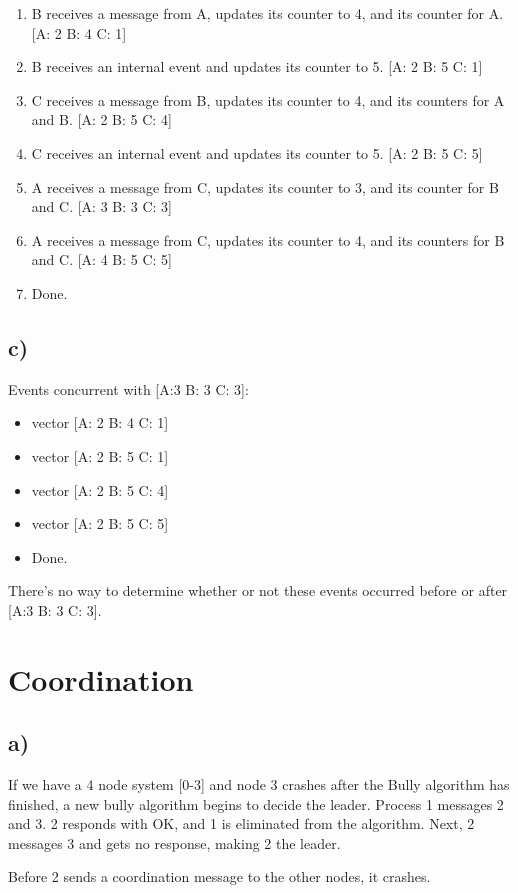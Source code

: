 \documentclass[12pt]{article}
\begin{document}
\begin{enumerate}
\item B receives a message from A, updates its counter to 4, and its counter for A.
[A: 2 B: 4 C: 1]
\item B receives an internal event and updates its counter to 5. [A: 2 B: 5 C: 1]
\item C receives a message from B, updates its counter to 4, and its counters for A and B. [A: 2 B: 5 C: 4]
\item C receives an internal event and updates its counter to 5. [A: 2 B: 5 C: 5]
\item A receives a message from C, updates its counter to 3, and its counter for B and C. [A: 3 B: 3 C: 3]
\item A receives a message from C, updates its counter to 4, and its counters for B and C. [A: 4 B: 5 C: 5]
\item Done.
\end{enumerate}
\subsection*{c)}

Events concurrent with [A:3 B: 3 C: 3]:

\begin{itemize}
\item vector [A: 2 B: 4 C: 1]
\item vector [A: 2 B: 5 C: 1]
\item vector [A: 2 B: 5 C: 4]
\item vector [A: 2 B: 5 C: 5]
\item Done.
\end{itemize}
There's no way to determine whether or not these events occurred before or after [A:3 B: 3 C: 3].
\section{Coordination}
\subsection*{a)}
If we have a 4 node system [0-3] and node 3 crashes after the Bully algorithm has finished, a new bully algorithm begins to decide the leader. Process 1 messages 2 and 3. 2 responds with OK, and 1 is eliminated from the algorithm. Next, 2 messages 3 and gets no response, making 2 the leader.

Before 2 sends a coordination message to the other nodes, it crashes.
\end{document}
